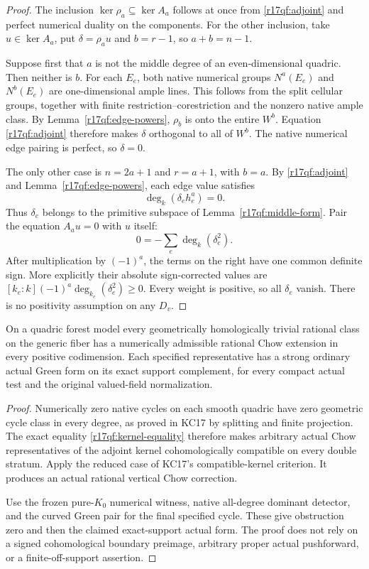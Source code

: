 \begin{proof}
The inclusion $\ker\rho_a\subseteq\ker A_a$ follows at once
from \eqref{r17qf:adjoint} and perfect numerical duality on
the components.  For the other inclusion, take $u\in\ker A_a$,
put $\delta=\rho_a u$ and $b=r-1$, so $a+b=n-1$.

Suppose first that $a$ is not the middle degree of an
even-dimensional quadric.  Then neither is $b$.
For each $E_e$, both native numerical groups $N^a(E_e)$ and
$N^b(E_e)$ are one-dimensional ample lines.  This follows
from the split cellular groups, together with finite
restriction--corestriction and the nonzero native ample
class.  By Lemma~\ref{r17qf:edge-powers},
$\rho_b$ is onto the entire $W^b$.  Equation
\eqref{r17qf:adjoint} therefore makes $\delta$ orthogonal
to all of $W^b$.  The native numerical edge pairing is
perfect, so $\delta=0$.

The only other case is $n=2a+1$ and $r=a+1$, with $b=a$.
By \eqref{r17qf:adjoint} and
Lemma~\ref{r17qf:edge-powers}, each edge value satisfies
\[
                        \deg_k(\delta_e h_e^a)=0.
\]
Thus $\delta_e$ belongs to the primitive subspace of
Lemma~\ref{r17qf:middle-form}.  Pair the equation $A_a u=0$
with $u$ itself:
\[
                  0=-\sum_e\deg_k(\delta_e^2).
 \tag{QF17.4}\label{r17qf:energy}
\]
After multiplication by $(-1)^a$, the terms on the right
have one common definite sign.  More explicitly their
absolute sign-corrected values are
$[k_e:k](-1)^a\deg_{k_e}(\delta_e^2)\ge0$.
Every weight is positive, so all $\delta_e$ vanish.
There is no positivity assumption on any $D_v$.
\end{proof}

\begin{corollary}
\label{r17qf:actual}
On a quadric forest model every geometrically homologically
trivial rational class on the generic fiber has a numerically
admissible rational Chow extension in every positive codimension.
Each specified representative has a strong ordinary actual Green
form on its exact support complement, for every compact actual
test and the original valued-field normalization.
\end{corollary}

\begin{proof}
Numerically zero native cycles on each smooth quadric have
zero geometric cycle class in every degree, as proved in
KC17 by splitting and finite projection.  The exact equality
\eqref{r17qf:kernel-equality} therefore makes arbitrary actual
Chow representatives of the adjoint kernel cohomologically
compatible on every double stratum.  Apply the reduced case
of KC17's compatible-kernel criterion.  It produces an actual
rational vertical Chow correction.

Use the frozen pure-$K_0$ numerical witness, native all-degree
dominant detector, and the curved Green pair for the final
specified cycle.  These give obstruction zero and then the
claimed exact-support actual form.  The proof does not rely
on a signed cohomological boundary preimage, arbitrary proper
actual pushforward, or a finite-off-support assertion.
\end{proof}

